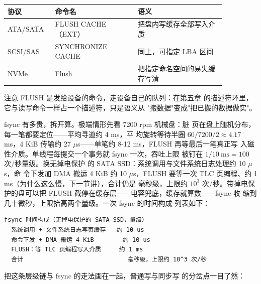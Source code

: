 \begin{longtable}{L{0.16\linewidth}L{0.34\linewidth}L{0.36\linewidth}}
\toprule
协议 & 命令名 & 语义 \\
\midrule
ATA/SATA & FLUSH CACHE（EXT） & 把盘内写缓存全部写入介质 \\
SCSI/SAS & SYNCHRONIZE CACHE & 同上，可指定 LBA 区间 \\
NVMe & Flush & 把指定命名空间的易失缓存写清 \\
\bottomrule
\end{longtable}

注意 FLUSH 是发给设备的命令，走设备自己的队列：在第五章
的描述符环里，它与读写命令一样占一个描述符，只是语义从
"搬数据"变成"把已搬的数据做实"。

fsync 有多贵，拆开算。极端情形先看 7200 rpm 机械盘：脏
页在盘上随机分布，每一笔都要定位——平均寻道约 4 ms，平
均旋转等待半圈 $60/7200/2\approx4.17$ ms，4 KiB 传输约
27 $\mu$s——单笔约 8-12 ms，FLUSH 再等最后一笔真正写
入磁性介质。单线程每提交一个事务就 fsync 一次，吞吐上限
被钉在 $1/10\ \mathrm{ms}=100$ 次/秒量级。换无掉电保护
的 SATA SSD：系统调用与文件系统日志处理约 10 $\mu$s，命
令下发加 DMA 搬运 4 KiB 约 10 $\mu$s，FLUSH 要等一次
TLC 页编程、约 1 ms（为什么这么慢，下一节讲），合计仍是
毫秒级，上限约 $10^{3}$ 次/秒。带掉电保护的盘可以把
FLUSH 截停在缓存层——电容兜底，缓存就算数——fsync 收
缩到几十微秒，上限抬高两个量级。一次 fsync 的时间构成
列表如下：

\begin{lstlisting}
fsync 时间构成（无掉电保护的 SATA SSD，量级）
  系统调用 + 文件系统日志写页缓存   约 10 us
  命令下发 + DMA 搬运 4 KiB        约 10 us
  FLUSH：等 TLC 页编程写入介质     约 1 ms
  合计                             毫秒级，上限约 10^3 次/秒
\end{lstlisting}

把这条层级链与 fsync 的走法画在一起，普通写与同步写
的分岔点一目了然：


